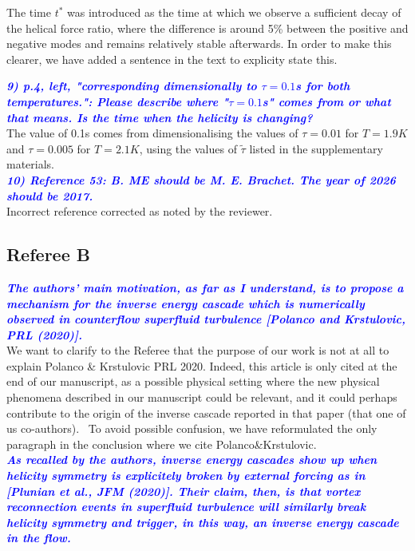 \documentclass[a4paper,10pt]{article}
\def\blue#1{\textcolor{blue}{#1}}
\def\refcomment#1{\textbf{\blue{\emph{#1}}}\\}
\begin{document}
    The time $t^*$ was introduced as the time at which we observe a sufficient decay of the helical force ratio, where the difference is around 5\% between the positive and negative modes and remains relatively stable afterwards. In order to make this clearer, we have added a sentence in the text to explicity state this.

    \refcomment{9) p.4, left, "corresponding dimensionally to $\tau = 0.1$s for both
    temperatures.": Please describe where "$\tau = 0.1$s" comes from or what
    that means. Is the time when the helicity is changing?}
    
    The value of 0.1s comes from dimensionalising the values of $\tau=0.01$ for $T=1.9K$ and $\tau=0.005$ for $T=2.1K$, using the values of $\tilde{\tau}$ listed in the supplementary materials. \\
    
    \refcomment{10) Reference 53: B. ME should be M. E. Brachet. The year of 2026
    should be 2017.}

    Incorrect reference corrected as noted by the reviewer.\\




\newpage
\subsection*{Referee B}

\refcomment{The authors’ main motivation, as far as I understand, is to propose a mechanism for the inverse energy cascade which is numerically observed in counterflow superfluid turbulence [Polanco and Krstulovic, PRL (2020)].}

We want to clarify to the Referee that the purpose of our work is not at all to explain Polanco \& Krstulovic PRL 2020. Indeed, this article is only cited at the end of our manuscript, as a possible physical setting where the new physical phenomena described in our manuscript could be relevant, and it could perhaps contribute to the origin of the inverse cascade reported in that paper (that one of us co-authors).  To avoid possible confusion, we have reformulated the only paragraph in the conclusion where we cite Polanco\&Krstulovic.\\

\refcomment{As recalled by the authors, inverse energy cascades show up when helicity symmetry is explicitely broken by external forcing as in [Plunian et al., JFM (2020)]. Their claim, then, is that vortex reconnection events in superfluid turbulence will similarly break helicity symmetry and trigger, in this way, an inverse energy cascade in the flow.}
\end{document}
